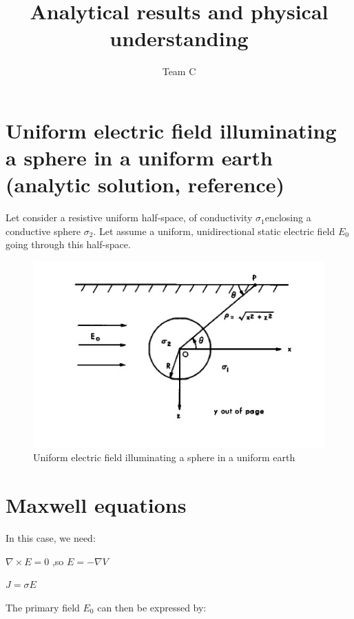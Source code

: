 \documentclass[11pt,letterpaper,leqno]{amsart}
\title{Analytical results and physical understanding}
\author{Team C}
\numberwithin{equation}{section}
\begin{document}
\maketitle
\thispagestyle{empty}




\normalsize

\vspace{0.4cm}


\section{Uniform electric field illuminating a sphere in a uniform earth (analytic solution, reference)}



Let consider a  resistive uniform half-space, of conductivity $\sigma_1$enclosing a conductive sphere $\sigma_2$. Let assume a uniform, unidirectional static electric field $E_0$ going through this half-space.

\begin{figure}[h]
\caption{Uniform electric field illuminating a sphere in a uniform earth}
\includegraphics[scale=0.7]{ElectroStaticSphere.png}
\end{figure}

\section{Maxwell equations}

In this case, we need:

$\nabla \times E =0$ \quad,so \quad $E=-\nabla V$

$J=\sigma E$

The primary field $E_0$ can then be expressed by:
\end{document}
